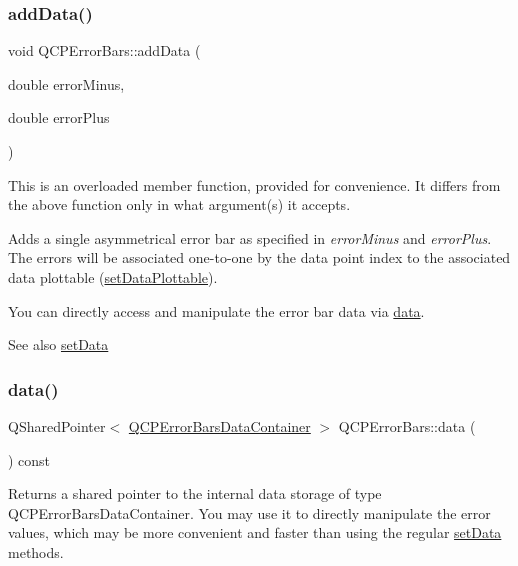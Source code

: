 \subsubsection{\texorpdfstring{add\+Data()}{addData()}\hspace{0.1cm}{\footnotesize\ttfamily [4/4]}}
{\footnotesize\ttfamily void Q\+C\+P\+Error\+Bars\+::add\+Data (\begin{DoxyParamCaption}\item[{double}]{error\+Minus,  }\item[{double}]{error\+Plus }\end{DoxyParamCaption})}

This is an overloaded member function, provided for convenience. It differs from the above function only in what argument(s) it accepts.

Adds a single asymmetrical error bar as specified in {\itshape error\+Minus} and {\itshape error\+Plus}. The errors will be associated one-\/to-\/one by the data point index to the associated data plottable (\hyperlink{class_q_c_p_error_bars_aabb42a964cfbf780cd1c79850c7cd989}{set\+Data\+Plottable}).

You can directly access and manipulate the error bar data via \hyperlink{class_q_c_p_error_bars_aeebd1b14f4c3573565efafd514988813}{data}.

\begin{DoxySeeAlso}{See also}
\hyperlink{class_q_c_p_error_bars_a92b1980003255f5f7c05407a4d92aabc}{set\+Data} 
\end{DoxySeeAlso}
\mbox{\label{class_q_c_p_error_bars_aeebd1b14f4c3573565efafd514988813}} 
\subsubsection{\texorpdfstring{data()}{data()}}
{\footnotesize\ttfamily Q\+Shared\+Pointer$<$ \hyperlink{class_q_vector}{Q\+C\+P\+Error\+Bars\+Data\+Container} $>$ Q\+C\+P\+Error\+Bars\+::data (\begin{DoxyParamCaption}{ }\end{DoxyParamCaption}) const\hspace{0.3cm}{\ttfamily [inline]}}

Returns a shared pointer to the internal data storage of type Q\+C\+P\+Error\+Bars\+Data\+Container. You may use it to directly manipulate the error values, which may be more convenient and faster than using the regular \hyperlink{class_q_c_p_error_bars_a92b1980003255f5f7c05407a4d92aabc}{set\+Data} methods. \mbox{\label{class_q_c_p_error_bars_ad8811b034a17cb4ef898cbcc8da29bd2}} 
